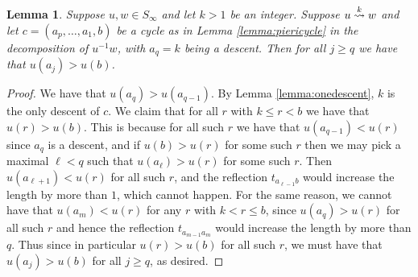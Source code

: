 \documentclass{amsart}
\newtheorem{lemma}{Lemma}[section]
\theoremstyle{definition}
\theoremstyle{remark}
\numberwithin{equation}{section}
\newcommand{\xrightsquigarrow}[2][]{%
	\mathrel{\mathop{\rightsquigarrow}\limits^{\scriptstyle #2}%
	\ifx\hfuzz#1\hfuzz\else_{\scriptstyle #1}\fi}%
}
\newcommand{\tom}[1]{\ensuremath{\xrightsquigarrow{#1}}}
\begin{document}
\begin{lemma} \label{lemma:geq}
Suppose $u,w\in S_\infty$ and let $k>1$ be an integer. Suppose $u\tom{k}w$ and let $c=(a_p,\ldots,a_1,b)$ be a cycle as in Lemma \ref{lemma:piericycle} in the decomposition of $u^{-1}w$, with $a_q=k$ being a descent. Then for all $j\geq q$ we have that $u(a_j)>u(b)$.
\end{lemma}
\begin{proof}
We have that $u(a_q)>u(a_{q-1})$. By Lemma \ref{lemma:onedescent}, $k$ is the only descent of $c$. We claim that for all $r$ with $k\leq r<b$ we have that $u(r)>u(b)$. This is because for all such $r$ we have that $u(a_{q-1})<u(r)$ since $a_q$ is a descent, and if $u(b)>u(r)$ for some such $r$ then we may pick a maximal $\ell<q$ such that $u(a_{\ell})>u(r)$ for some such $r$. Then $u(a_{\ell+1})<u(r)$ for all such $r$, and the reflection $t_{a_{\ell-1} b}$ would increase the length by more than $1$, which cannot happen. For the same reason, we cannot have that $u(a_m)<u(r)$ for any $r$ with $k<r\leq b$, since $u(a_q)>u(r)$ for all such $r$ and hence the reflection $t_{a_{m-1}a_m}$ would increase the length by more than $q$. Thus since in particular $u(r)>u(b)$ for all such $r$, we must have that $u(a_j)>u(b)$ for all $j\geq q$, as desired.
\end{proof}
\end{document}
